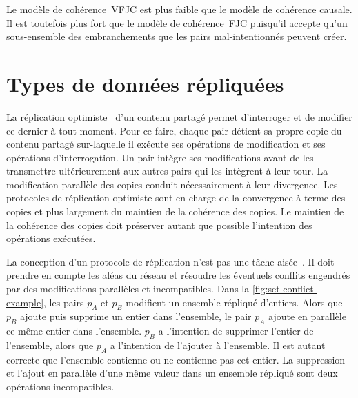 Le modèle de cohérence~\ac{VFJC} est plus faible que le modèle de cohérence causale.
Il est toutefois plus fort que le modèle de cohérence~\ac{FJC} puisqu'il accepte qu'un sous-ensemble des embranchements que les pairs mal-intentionnés peuvent créer.


\section{Types de données répliquées}\label{sec:crdt}

La réplication optimiste~\autocite{saito_2005_optimisticreplication} d'un contenu partagé permet d'interroger et de modifier ce dernier à tout moment.
Pour ce faire, chaque pair détient sa propre copie du contenu partagé sur-laquelle il exécute ses opérations de modification et ses opérations d'interrogation.
Un pair intègre ses modifications avant de les transmettre ultérieurement aux autres pairs qui les intègrent à leur tour.
La modification parallèle des copies conduit nécessairement à leur divergence.
Les protocoles de réplication optimiste sont en charge de la convergence à terme des copies et plus largement du maintien de la cohérence des copies.
Le maintien de la cohérence des copies doit préserver autant que possible l'intention des opérations exécutées.

La conception d'un protocole de réplication n'est pas une tâche aisée~\autocite{oster2005_otisuues}.
Il doit prendre en compte les aléas du réseau et résoudre les éventuels conflits engendrés par des modifications parallèles et incompatibles.
Dans la \autoref{fig:set-conflict-example}, les pairs $p_A$ et $p_B$ modifient un ensemble répliqué d'entiers.
Alors que $p_B$ ajoute puis supprime un entier dans l'ensemble, le pair $p_A$ ajoute en parallèle ce même entier dans l'ensemble.
$p_B$ a l'intention de supprimer l'entier de l'ensemble, alors que $p_A$ a l'intention de l'ajouter à l'ensemble.
Il est autant correcte que l'ensemble contienne ou ne contienne pas cet entier.
La suppression et l'ajout en parallèle d'une même valeur dans un ensemble répliqué sont deux opérations incompatibles.


